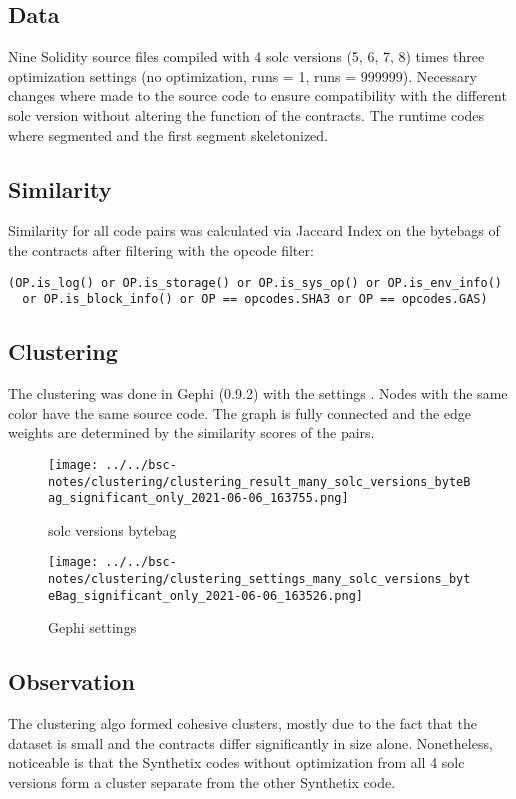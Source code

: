 \documentclass[../main.tex]{subfiles}
\begin{document}
\subsection{Data}
Nine Solidity source files compiled with 4 solc versions (5, 6, 7, 8) times three optimization
settings (no optimization, runs = 1, runs = 999999).
Necessary changes where made to the source code to ensure compatibility with the different solc
version without altering the function of the contracts.
The runtime codes where segmented and the first segment skeletonized.

\subsection{Similarity}
Similarity for all code pairs was calculated via Jaccard Index on the bytebags of the contracts after filtering with the opcode filter:

\begin{lstlisting}[style=pymd]
(OP.is_log() or OP.is_storage() or OP.is_sys_op() or OP.is_env_info()
  or OP.is_block_info() or OP == opcodes.SHA3 or OP == opcodes.GAS)
\end{lstlisting}

\subsection{Clustering}
The clustering  was done in Gephi (0.9.2) with the settings .
Nodes with the same color have the same source code.
The graph is fully connected and the edge weights are determined by the similarity scores of the pairs.

\begin{figure*}[ht!]
  \texttt{[image: ../../bsc-notes/clustering/clustering\_result\_many\_solc\_versions\_byteBag\_significant\_only\_2021-06-06\_163755.png]}
  \caption{solc versions bytebag}
  \label{fig:solc_bytebag_cluster}
\end{figure*}

\begin{figure*}[ht!]
  \centering
  \texttt{[image: ../../bsc-notes/clustering/clustering\_settings\_many\_solc\_versions\_byteBag\_significant\_only\_2021-06-06\_163526.png]}
  \caption{Gephi settings}
  \label{fig:solc_bytebag_cluster_settings}
\end{figure*}

\subsection{Observation}
The clustering algo formed cohesive clusters, mostly due to the fact that the dataset is small and the contracts differ significantly in size alone.
Nonetheless, noticeable is that the Synthetix codes without optimization from all 4 solc versions form a cluster separate from the other Synthetix code.
\end{document}
